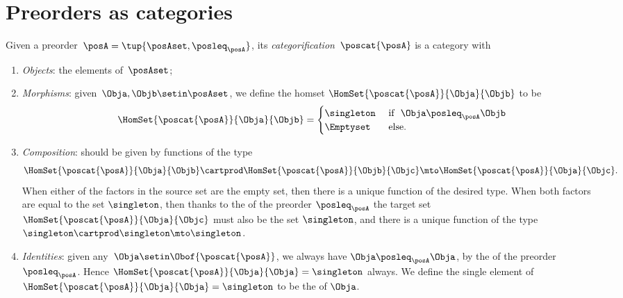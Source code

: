 
\section[Preorders as categories]{Preorders as categories}
\label{sec:posets-as-cats}

\begin{ctdefinition}\label{def:poscat}
    Given a preorder~$\posA = \tup{\posAset, \posleq_\posA}$, its \emph{categorification}~$\poscat{\posA}$ is a category with
    \begin{enumerate}
        \item \emph{Objects}: the elements of~$\posAset$;
        \item \emph{Morphisms}: given~$\Obja,\Objb\setin \posAset$, we define the homset $\HomSet{\poscat{\posA}}{\Obja}{\Objb}$ to be
              \begin{equation}
                  \HomSet{\poscat{\posA}}{\Obja}{\Objb} =
                  \begin{cases}
                      \singleton & \text{ if }  \ \Obja \posleq_\posA \Objb \\
                      \Emptyset  & \text{ else. }
                  \end{cases}
              \end{equation}
        \item \emph{Composition}: should be given by functions of the type
              \begin{equation}
                  \HomSet{\poscat{\posA}}{\Obja}{\Objb} \cartprod \HomSet{\poscat{\posA}}{\Objb}{\Objc} \mto \HomSet{\poscat{\posA}}{\Obja}{\Objc}.
              \end{equation}
              When either of the factors in the source set are the empty set, then there is a unique function of the desired type.
              When both factors are equal to the set $\singleton$, then thanks to the \emph{} of the preorder $\posleq_\posA$ the target set $\HomSet{\poscat{\posA}}{\Obja}{\Objc}$ must also be the set $\singleton$, and there is a unique function of the type $\singleton \cartprod \singleton \mto \singleton$.
        \item \emph{Identities}: given any~$\Obja \setin \Obof{\poscat{\posA}}$, we always have $\Obja \posleq_\posA \Obja$, by the \emph{} of the preorder $\posleq_\posA$.
              Hence $\HomSet{\poscat{\posA}}{\Obja}{\Obja} = \singleton$ always.
              We define the single element of $\HomSet{\poscat{\posA}}{\Obja}{\Obja} = \singleton$ to be the  of $\Obja$.
    \end{enumerate}
\end{ctdefinition}

